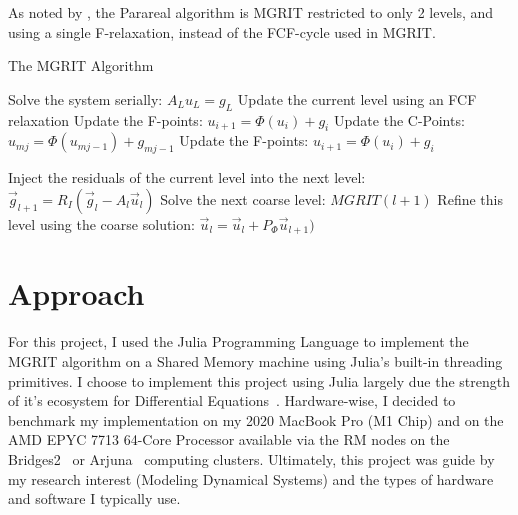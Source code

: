 \documentclass{article}
\begin{document}
As noted by \citeauthor{friedhoffMULTIGRIDINTIMEALGORITHMSOLVING}, the Parareal algorithm is MGRIT restricted to only 2 levels, and using a single F-relaxation, instead of the FCF-cycle used in MGRIT.

\begin{algorithm}[h]
    \caption{The MGRIT Algorithm}\label{alg:mgrit}
    \begin{algorithmic}

            \State Solve the system serially: $A_L u_L = g_L$
        \Else
            \State Update the current level using an FCF relaxation
              
                \State Update the F-points: $u_{i+1} = \Phi(u_i) + g_i$
            \EndFor
              
                \State Update the C-Points: $u_{mj} = \Phi(u_{mj-1}) + g_{mj-1}$
            \EndFor
              
                \State Update the F-points: $u_{i+1} = \Phi(u_i) + g_i$
            \EndFor

            \State Inject the residuals of the current level into the next level: $\vec{g}_{l+1} = R_I(\vec{g}_l - A_l \vec{u}_l)$
            \State Solve the next coarse level: $MGRIT(l+1)$
            \State Refine this level using the coarse solution: $\vec{u}_l = \vec{u}_l + P_{\Phi} \vec{u}_{l+1})$
        \EndIf
    \end{algorithmic}
\end{algorithm}

\section{Approach}

For this project, I used the Julia Programming Language\cite{Julia-2017} to implement the MGRIT algorithm on a Shared Memory machine using Julia's built-in threading primitives.
I choose to implement this project using Julia largely due the strength of it's ecosystem for Differential Equations~\cite{rackauckasDifferentialEquationsJlPerformant2017a}.
Hardware-wise, I decided to benchmark my implementation on my 2020 MacBook Pro (M1 Chip) and on the AMD EPYC 7713 64-Core Processor available via the RM nodes on the Bridges2~\cite{Bridges2} or Arjuna~\cite{ArjunaComputingCluster} computing clusters.
Ultimately, this project was guide by my research interest (Modeling Dynamical Systems) and the types of hardware and software I typically use.
\end{document}
